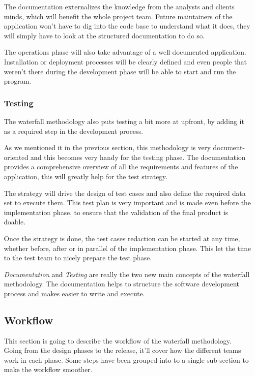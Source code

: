 The documentation externalizes the knowledge from the analysts and clients
minds, which will benefit the whole project team.
Future maintainers of the application won't have to dig into the code base to
understand what it does, they will simply have to look at the structured
documentation to do so.

The operations phase will also take advantage of a well documented
application.
Installation or deployment processes will be clearly defined and even people
that  weren't there during the development phase will be able to start and
run the program.

\subsubsection{Testing}

The waterfall methodology also puts testing a bit more at upfront, by adding
it as a required step in the development process.

As we mentioned it in the previous section, this methodology is very
document-oriented and this becomes very handy for the testing phase.
The documentation provides a comprehensive overview of all the requirements
and features of the application, this will greatly help for the test
strategy.

The strategy will drive the design of test cases and also define the
required data set to execute them.
This test plan is very important and is made even before the implementation
phase, to ensure that the validation of the final product is doable.

Once the strategy is done, the test cases redaction can be started at any
time, whether before, after or in parallel of the implementation phase.
This let the time to the test team to nicely prepare the test phase.

\textit{Documentation} and \textit{Testing} are really the two new main
concepts of the waterfall methodology.
The documentation helps to structure the software development process and
makes easier to write and execute.

\subsection{Workflow}\label{subsec:workflow}

This section is going to describe the workflow of the waterfall methodology.
Going from the design phases to the release, it'll cover how the
different teams work in each phase.
Some steps have been grouped into to a single sub section to make the
workflow smoother.

